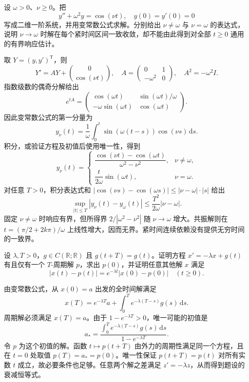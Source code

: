 \begin{exercise}[受迫振子与共振极限]\label{b2:ex:ode-resonance}
设 \(\omega>0\)、\(\nu\geq0\)。把
\[
 y''+\omega^2y=\cos(\nu t),\quad y(0)=y'(0)=0
\]
写成二维一阶系统，并用变常数公式求解。分别给出 \(\nu\ne\omega\) 与 \(\nu=\omega\) 的表达式，说明 \(\nu\to\omega\) 时解在每个紧时间区间一致收敛，却不能由此得到对全部 \(t\geq0\) 通用的有界响应估计。
\end{exercise}
\begin{solution}
取 \(Y=(y,y')^{\mathsf T}\)，则
\[
 Y'=AY+\binom{0}{\cos(\nu t)},\quad
 A=\begin{pmatrix}0&1\\-\omega^2&0\end{pmatrix},\quad A^2=-\omega^2I.
\]
指数级数的偶奇分解给出
\[
 e^{tA}=\begin{pmatrix}
 \cos(\omega t)&\sin(\omega t)/\omega\\
 -\omega\sin(\omega t)&\cos(\omega t)
 \end{pmatrix}.
\]
因此变常数公式的第一分量为
\[
 y_\nu(t)=\frac1\omega\int_0^t\sin(\omega(t-s))\cos(\nu s)\,\mathrm ds.
\]
积分，或验证方程及初值后使用唯一性，得到
\[
 y_\nu(t)=
 \begin{cases}
 \dfrac{\cos(\nu t)-\cos(\omega t)}{\omega^2-\nu^2},&\nu\ne\omega,\\[5pt]
 \dfrac{t}{2\omega}\sin(\omega t),&\nu=\omega.
 \end{cases}
\]
对任意 \(T>0\)，积分表达式和 \(|\cos(\nu s)-\cos(\omega s)|\leq|\nu-\omega|\cdot|s|\) 给出
\[
 \sup_{|t|\leq T}|y_\nu(t)-y_\omega(t)|
 \leq\frac{T^2}{2\omega}|\nu-\omega|.
\]
固定 \(\nu\ne\omega\) 时响应有界，但所得界 \(2/|\omega^2-\nu^2|\) 随 \(\nu\to\omega\) 增大。共振解则在 \(t=(\pi/2+2k\pi)/\omega\) 上线性增大，因而无界。紧时间连续依赖没有提供无穷时间的一致界。
\end{solution}

\begin{exercise}[周期外力的唯一周期响应]\label{b2:ex:ode-periodic-forcing}
设 \(\lambda,T>0\)，\(g\in C(\mathbb R;\mathbb R)\) 且 \(g(t+T)=g(t)\)。证明方程 \(x'=-\lambda x+g(t)\) 有且仅有一个 \(T\)-周期解 \(p\)，求出 \(p(0)\)，并证明任意其他解 \(x\) 满足
\[
 |x(t)-p(t)|=e^{-\lambda t}|x(0)-p(0)|\quad(t\geq0).
\]
\end{exercise}
\begin{solution}
由变常数公式，从 \(x(0)=a\) 出发的全时间解满足
\[
 x(T)=e^{-\lambda T}a+\int_0^T e^{-\lambda(T-s)}g(s)\,\mathrm ds.
\]
周期解必须满足 \(x(T)=a\)。由于 \(1-e^{-\lambda T}>0\)，唯一可能的初值是
\[
 a_* =\frac{\displaystyle\int_0^T e^{-\lambda(T-s)}g(s)\,\mathrm ds}
 {1-e^{-\lambda T}}.
\]
令 \(p\) 为这个初值的解。函数 \(t\mapsto p(t+T)\) 由外力的周期性满足同一个方程，且在 \(t=0\) 处取值 \(p(T)=a_*=p(0)\)。唯一性保证 \(p(t+T)=p(t)\) 对所有实数 \(t\) 成立，故必要条件也足够。任意两个解之差满足 \(z'=-\lambda z\)，从而得到题设的衰减恒等式。
\end{solution}

